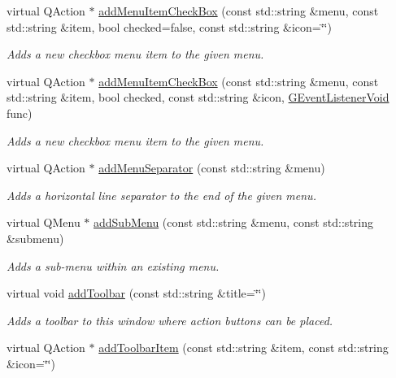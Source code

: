 \begin{DoxyCompactItemize}
virtual Q\+Action $\ast$ \mbox{\hyperlink{classsgl_1_1GWindow_ae363de5d4c0d5848a5936563b12c3288}{add\+Menu\+Item\+Check\+Box}} (const std\+::string \&menu, const std\+::string \&item, bool checked=false, const std\+::string \&icon=\char`\"{}\char`\"{})
\begin{DoxyCompactList}\small\item\em Adds a new checkbox menu item to the given menu. \end{DoxyCompactList}\item 
virtual Q\+Action $\ast$ \mbox{\hyperlink{classsgl_1_1GWindow_aab18d66dc7ed71468da3611b28450995}{add\+Menu\+Item\+Check\+Box}} (const std\+::string \&menu, const std\+::string \&item, bool checked, const std\+::string \&icon, \mbox{\hyperlink{namespacesgl_a54427ce97bb1c2804e4fe2b0a62e8b17}{G\+Event\+Listener\+Void}} func)
\begin{DoxyCompactList}\small\item\em Adds a new checkbox menu item to the given menu. \end{DoxyCompactList}\item 
virtual Q\+Action $\ast$ \mbox{\hyperlink{classsgl_1_1GWindow_abdf4f167a7135e31ecb8f3363fddfd19}{add\+Menu\+Separator}} (const std\+::string \&menu)
\begin{DoxyCompactList}\small\item\em Adds a horizontal line separator to the end of the given menu. \end{DoxyCompactList}\item 
virtual Q\+Menu $\ast$ \mbox{\hyperlink{classsgl_1_1GWindow_a557f7b2372831420546b73239027d2ae}{add\+Sub\+Menu}} (const std\+::string \&menu, const std\+::string \&submenu)
\begin{DoxyCompactList}\small\item\em Adds a sub-\/menu within an existing menu. \end{DoxyCompactList}\item 
virtual void \mbox{\hyperlink{classsgl_1_1GWindow_ab523bda15e486bc3c968059c8b23a8d9}{add\+Toolbar}} (const std\+::string \&title=\char`\"{}\char`\"{})
\begin{DoxyCompactList}\small\item\em Adds a toolbar to this window where action buttons can be placed. \end{DoxyCompactList}\item 
virtual Q\+Action $\ast$ \mbox{\hyperlink{classsgl_1_1GWindow_ac34ab48bd20d31312ccbf90b7120c5bb}{add\+Toolbar\+Item}} (const std\+::string \&item, const std\+::string \&icon=\char`\"{}\char`\"{})

\end{DoxyCompactItemize}
